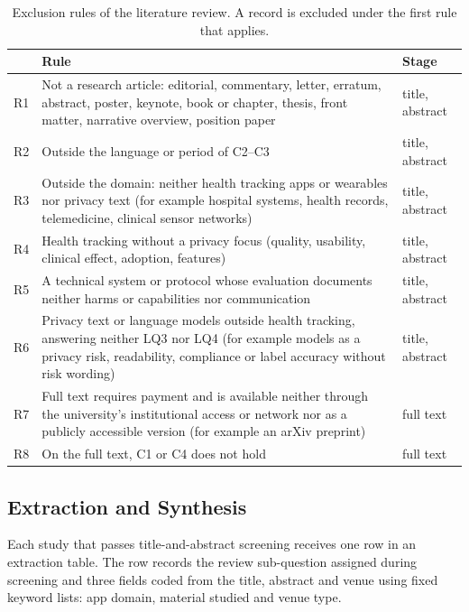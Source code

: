\begin{table}[H]
\centering
\begin{singlespace}
\caption[Exclusion rules of the literature review]{Exclusion rules of the
literature review. A record is excluded under the first rule that applies.}
\label{tab:lit-criteria}
\small
\begin{tabularx}{\textwidth}{@{}l>{\raggedright\arraybackslash}X>{\raggedright\arraybackslash}p{2.0cm}@{}}
\toprule
 & \textbf{Rule} & \textbf{Stage} \\
\midrule
R1 & Not a research article: editorial, commentary, letter, erratum, abstract, poster, keynote, book or chapter, thesis, front matter, narrative overview, position paper & title, abstract \\
R2 & Outside the language or period of C2--C3 & title, abstract \\
R3 & Outside the domain: neither health tracking apps or wearables nor privacy text (for example hospital systems, health records, telemedicine, clinical sensor networks) & title, abstract \\
R4 & Health tracking without a privacy focus (quality, usability, clinical effect, adoption, features) & title, abstract \\
R5 & A technical system or protocol whose evaluation documents neither harms or capabilities nor communication & title, abstract \\
R6 & Privacy text or language models outside health tracking, answering neither LQ3 nor LQ4 (for example models as a privacy risk, readability, compliance or label accuracy without risk wording) & title, abstract \\
R7 & Full text requires payment and is available neither through the university's institutional access or network nor as a publicly accessible version (for example an arXiv preprint) & full text \\
R8 & On the full text, C1 or C4 does not hold & full text \\
\bottomrule
\end{tabularx}
\end{singlespace}
\end{table}

\subsection{Extraction and Synthesis}
\label{sec:lit-synthesis}
Each study that passes title-and-abstract screening receives one row in an extraction table.
The row records the review sub-question assigned during screening and three fields coded from
the title, abstract and venue using fixed keyword lists: app domain, material studied and venue
type.

